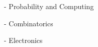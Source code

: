 \begin{cventries}
{\begin{cvitems}
\begin{multicols}{3}
          \item[-] {Probability and Computing}
          \item[-] {Combinatorics}
          \item[-] {Electronics}
        \end{multicols}
      \end{cvitems}
    }
\end{cventries}
